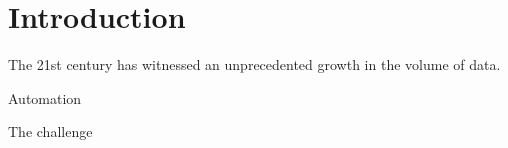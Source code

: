 \chapter{Introduction}

The 21st century has witnessed an unprecedented growth in the volume of data.

Automation

The challenge

\citep{barachant2013riemannian}